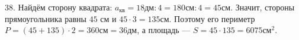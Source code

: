 38. Найдём сторону квадрата: $a_{\text{кв}}=18\text{дм}:4=180\text{см}:4=45$см. Значит, стороны прямоугольника равны $45$ см и $45\cdot3=135$см. Поэтому его периметр $P=(45+135)\cdot2=360\text{см}=36$дм, а площадь --- $S=45\cdot135=6075\text{см}^2.$\\
